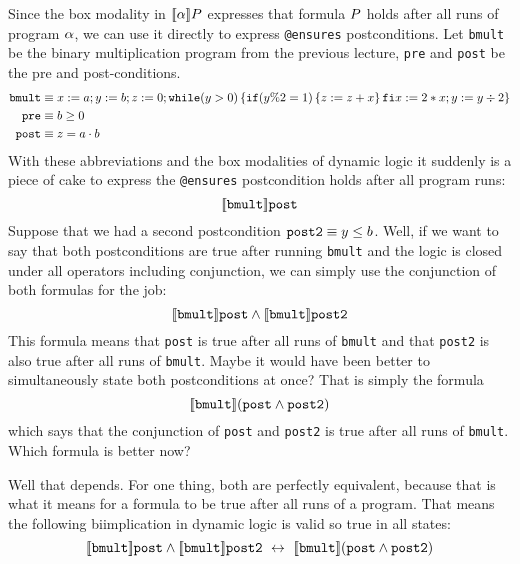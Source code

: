 \documentclass[11pt,twoside]{scrartcl}
\begin{document}
Since the box modality in \(\dbox{\asprg}{\asfml}\) expresses that formula $P$ holds after all runs of program $\alpha$, we can use it directly to express \verb'@ensures' postconditions.
Let \texttt{bmult} be the binary multiplication program from the previous lecture, \texttt{pre} and \texttt{post} be the pre and post-conditions.
\begin{align*}
  \texttt{bmult} &\equiv x:=a; y:=b; z:=0; \texttt{\upshape while}(y>0)\,\{ \texttt{\upshape if}(y\%2=1)\,\{ z:=z+x \}\texttt{\upshape \,fi} x:=2*x; y:=y \div 2\}\\
  \texttt{pre} &\equiv b \ge 0\\
  \texttt{post} &\equiv z = a \cdot b
\end{align*}
With these abbreviations and the box modalities of dynamic logic it suddenly is a piece of cake to express the \verb'@ensures' postcondition holds after all program runs:
\[
\dbox{\texttt{bmult}}{\texttt{post}}
\]
Suppose that we had a second postcondition $\texttt{post2} \equiv y \le b$.
Well, if we want to say that both postconditions are true after running \texttt{bmult} and the logic is closed under all operators including conjunction, we can simply use the conjunction of both formulas for the job:
\[
\dbox{\texttt{bmult}}{\texttt{post}} \land \dbox{\texttt{bmult}}{\texttt{post2}}
\]
This formula means that \texttt{post} is true after all runs of \texttt{bmult} and that \texttt{post2} is also true after all runs of \texttt{bmult}.
Maybe it would have been better to simultaneously state both postconditions at once?
That is simply the formula
\[
\dbox{\texttt{bmult}}{(\texttt{post} \land \texttt{post2})}
\]
which says that the conjunction of \texttt{post} and \texttt{post2} is true after all runs of \texttt{bmult}.
Which formula is better now?

Well that depends. For one thing, both are perfectly equivalent, because that is what it means for a formula to be true after all runs of a program.
That means the following biimplication in dynamic logic is valid so true in all states:
\[
\dbox{\texttt{bmult}}{\texttt{post}} \land \dbox{\texttt{bmult}}{\texttt{post2}}
~\lbisubjunct~
\dbox{\texttt{bmult}}{(\texttt{post} \land \texttt{post2})}
\]
\end{document}
